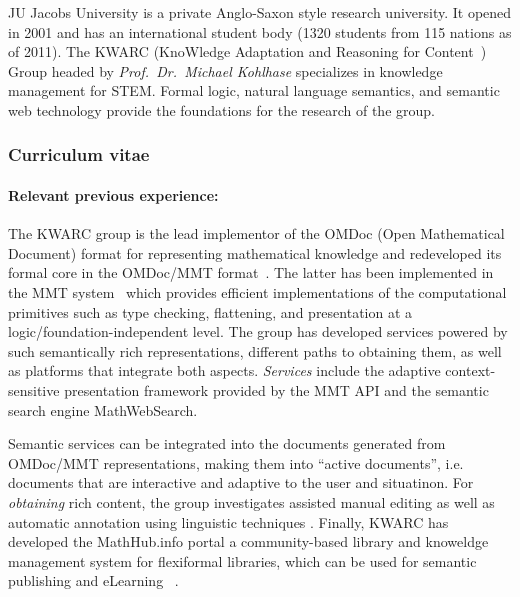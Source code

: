 \begin{sitedescription}{JU}
Jacobs University is a private Anglo-Saxon style research university.  It opened in 2001
and has an international student body (1320 students from 115 nations as of 2011).  The
KWARC (KnoWledge Adaptation and Reasoning for Content~\cite{KWARC:online}) Group headed by
{\emph{Prof.\ Dr.\ Michael Kohlhase}} specializes in knowledge management for STEM.
Formal logic, natural language semantics, and semantic web technology provide the
foundations for the research of the group.

\subsubsection*{Curriculum vitae}




\paragraph{Relevant previous experience:}

The KWARC group is the lead implementor of the OMDoc (Open Mathematical Document) format
for representing mathematical knowledge \cite{Kohlhase:OMDoc1.2} and redeveloped its
formal core in the OMDoc/MMT format~\cite{RabKoh:WSMSML13}. The latter has been
implemented in the MMT system~\cite{MMTSVN:on,RabKoh:WSMSML13} which provides efficient
implementations of the computational primitives such as type checking, flattening, and
presentation at a logic/foundation-independent level.  The group has developed services
powered by such semantically rich representations, different paths to obtaining them, as
well as platforms that integrate both aspects.  \emph{Services} include the adaptive
context-sensitive presentation framework provided by the MMT API and the semantic search
engine MathWebSearch\cite{KohSuc:asemf06,ProKoh:mwssofse12}. 

Semantic services can be integrated into the documents generated from OMDoc/MMT
representations, making them into ``active documents'', i.e. documents that are
interactive and adaptive to the user and situatinon.  For \emph{obtaining} rich content,
the group investigates assisted manual editing \cite{JucKoh:sidesc10:biblatex} as well as
automatic annotation using linguistic techniques \cite{GinJucAnc:alsaacl09}.  Finally,
KWARC has developed the \textsf{MathHub.info} portal a community-based library and
knoweldge management system for flexiformal libraries, which can be used for semantic
publishing and eLearning~ \cite{KohDavGin:psewads11,MathHub:on,IanJucKoh:sdm14}.


\end{sitedescription}
